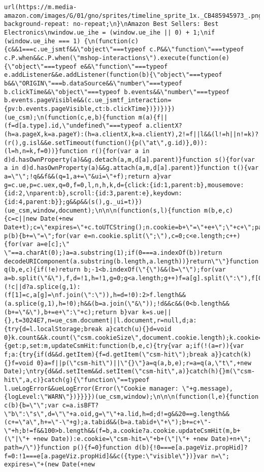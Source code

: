 \documentclass[
]{article}
\begin{document}
\begin{verbatim}
url(https://m.media-amazon.com/images/G/01/gno/sprites/timeline_sprite_1x._CB485945973_.png);\n  background-repeat: no-repeat;\n}\nAmazon Best Sellers: Best Electronics\nwindow.ue_ihe = (window.ue_ihe || 0) + 1;\nif (window.ue_ihe === 1) {\n(function(c){c&&1===c.ue_jsmtf&&\"object\"===typeof c.P&&\"function\"===typeof c.P.when&&c.P.when(\"mshop-interactions\").execute(function(e){\"object\"===typeof e&&\"function\"===typeof e.addListener&&e.addListener(function(b){\"object\"===typeof b&&\"ORIGIN\"===b.dataSource&&\"number\"===typeof b.clickTime&&\"object\"===typeof b.events&&\"number\"===typeof b.events.pageVisible&&(c.ue_jsmtf_interaction={pv:b.events.pageVisible,ct:b.clickTime})})})})(ue_csm);\n(function(c,e,b){function m(a){f||(f=d[a.type].id,\"undefined\"===typeof a.clientX?(h=a.pageX,k=a.pageY):(h=a.clientX,k=a.clientY),2!=f||l&&(l!=h||n!=k)?(r(),g.isl&&e.setTimeout(function(){p(\"at\",g.id)},0)):(l=h,n=k,f=0))}function r(){for(var a in d)d.hasOwnProperty(a)&&g.detach(a,m,d[a].parent)}function s(){for(var a in d)d.hasOwnProperty(a)&&g.attach(a,m,d[a].parent)}function t(){var a=\"\";!q&&f&&(q=1,a+=\"&ui=\"+f);return a}var g=c.ue,p=c.uex,q=0,f=0,l,n,h,k,d={click:{id:1,parent:b},mousemove:{id:2,\nparent:b},scroll:{id:3,parent:e},keydown:{id:4,parent:b}};g&&p&&(s(),g._ui=t)})(ue_csm,window,document);\n\n\n(function(s,l){function m(b,e,c){c=c||new Date(+new Date+t);c=\"expires=\"+c.toUTCString();n.cookie=b+\"=\"+e+\";\"+c+\";path=/\"}function p(b){b+=\"=\";for(var e=n.cookie.split(\";\"),c=0;c<e.length;c++){for(var a=e[c];\" \"==a.charAt(0);)a=a.substring(1);if(0===a.indexOf(b))return decodeURIComponent(a.substring(b.length,a.length))}return\"\"}function q(b,e,c){if(!e)return b;-1<b.indexOf(\"{\")&&(b=\"\");for(var a=b.split(\"&\"),f,d=!1,h=!1,g=0;g<a.length;g++)f=a[g].split(\":\"),f[0]==e?(!c||d?a.splice(g,1):(f[1]=c,a[g]=\nf.join(\":\")),h=d=!0):2>f.length&&(a.splice(g,1),h=!0);h&&(b=a.join(\"&\"));!d&&c&&(0<b.length&&(b+=\"&\"),b+=e+\":\"+c);return b}var k=s.ue||{},t=3024E7,n=ue_csm.document||l.document,r=null,d;a:{try{d=l.localStorage;break a}catch(u){}d=void 0}k.count&&k.count(\"csm.cookieSize\",document.cookie.length);k.cookie={get:p,set:m,updateCsmHit:function(b,e,c){try{var a;if(!(a=r)){var f;a:{try{if(d&&d.getItem){f=d.getItem(\"csm-hit\");break a}}catch(k){}f=void 0}a=f||p(\"csm-hit\")||\"{}\"}a=q(a,b,e);r=a=q(a,\"t\",+new Date);\ntry{d&&d.setItem&&d.setItem(\"csm-hit\",a)}catch(h){}m(\"csm-hit\",a,c)}catch(g){\"function\"==typeof l.ueLogError&&ueLogError(Error(\"Cookie manager: \"+g.message),{logLevel:\"WARN\"})}}}})(ue_csm,window);\n\n\n(function(l,e){function c(b){b=\"\";var c=a.isBFT?\"b\":\"s\",d=\"\"+a.oid,g=\"\"+a.lid,h=d;d!=g&&20==g.length&&(c+=\"a\",h+=\"-\"+g);a.tabid&&(b=a.tabid+\"+\");b+=c+\"-\"+h;b!=f&&100>b.length&&(f=b,a.cookie?a.cookie.updateCsmHit(m,b+(\"|\"+ +new Date)):e.cookie=\"csm-hit=\"+b+(\"|\"+ +new Date)+n+\"; path=/\")}function p(){f=0}function d(b){!0===e[a.pageViz.propHid]?f=0:!1===e[a.pageViz.propHid]&&c({type:\"visible\"})}var n=\"; expires=\"+(new Date(+new 
\end{verbatim}
\end{document}
